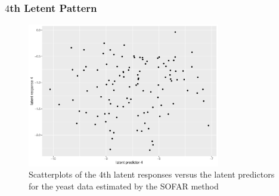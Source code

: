 \begin{frame} \frametitle{$4$th Letent Pattern}
    \begin{figure}[h]
        \centering
        \includegraphics[width=0.75\textwidth]{./figs/latent4.pdf}
        \caption{Scatterplots of the $4$th latent responses versus the latent predictors for the yeast data estimated by the SOFAR method}
    \end{figure}
\end{frame}

